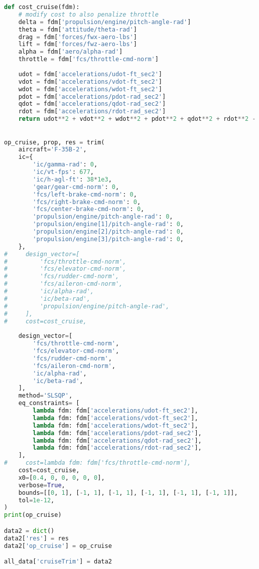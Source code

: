 \begin{lstlisting}[language=Python]
def cost_cruise(fdm):
    # modify cost to also penalize throttle
    delta = fdm['propulsion/engine/pitch-angle-rad']
    theta = fdm['attitude/theta-rad']
    drag = fdm['forces/fwx-aero-lbs']
    lift = fdm['forces/fwz-aero-lbs']
    alpha = fdm['aero/alpha-rad']
    throttle = fdm['fcs/throttle-cmd-norm']
    
    udot = fdm['accelerations/udot-ft_sec2']
    vdot = fdm['accelerations/vdot-ft_sec2']
    wdot = fdm['accelerations/wdot-ft_sec2']
    pdot = fdm['accelerations/pdot-rad_sec2']
    qdot = fdm['accelerations/qdot-rad_sec2']
    rdot = fdm['accelerations/rdot-rad_sec2']
    return udot**2 + vdot**2 + wdot**2 + pdot**2 + qdot**2 + rdot**2 - 1e-3*(lift/drag)**2 + 1e-3*(theta < 0) + 1e-1*throttle + 2e-1*delta**2 
        

op_cruise, prop, res = trim(
    aircraft='F-35B-2',
    ic={
        'ic/gamma-rad': 0,
        'ic/vt-fps': 677,
        'ic/h-agl-ft': 38*1e3,
        'gear/gear-cmd-norm': 0,
        'fcs/left-brake-cmd-norm': 0,
        'fcs/right-brake-cmd-norm': 0,
        'fcs/center-brake-cmd-norm': 0,
        'propulsion/engine/pitch-angle-rad': 0,
        'propulsion/engine[1]/pitch-angle-rad': 0,
        'propulsion/engine[2]/pitch-angle-rad': 0,
        'propulsion/engine[3]/pitch-angle-rad': 0,
    },
#     design_vector=[
#         'fcs/throttle-cmd-norm',
#         'fcs/elevator-cmd-norm',
#         'fcs/rudder-cmd-norm',
#         'fcs/aileron-cmd-norm',
#         'ic/alpha-rad',
#         'ic/beta-rad',
#         'propulsion/engine/pitch-angle-rad',
#     ],
#     cost=cost_cruise,
    
    design_vector=[
        'fcs/throttle-cmd-norm',
        'fcs/elevator-cmd-norm',
        'fcs/rudder-cmd-norm',
        'fcs/aileron-cmd-norm',
        'ic/alpha-rad',
        'ic/beta-rad',
    ],
    method='SLSQP',
    eq_constraints= [
        lambda fdm: fdm['accelerations/udot-ft_sec2'],
        lambda fdm: fdm['accelerations/vdot-ft_sec2'],
        lambda fdm: fdm['accelerations/wdot-ft_sec2'],
        lambda fdm: fdm['accelerations/pdot-rad_sec2'],
        lambda fdm: fdm['accelerations/qdot-rad_sec2'],
        lambda fdm: fdm['accelerations/rdot-rad_sec2'],
    ],
#     cost=lambda fdm: fdm['fcs/throttle-cmd-norm'],
    cost=cost_cruise,
    x0=[0.4, 0, 0, 0, 0, 0],
    verbose=True,
    bounds=[[0, 1], [-1, 1], [-1, 1], [-1, 1], [-1, 1], [-1, 1]],
    tol=1e-12,
)
print(op_cruise)

data2 = dict()
data2['res'] = res
data2['op_cruise'] = op_cruise

all_data['cruiseTrim'] = data2
\end{lstlisting}

